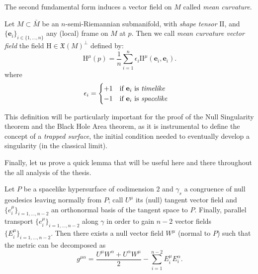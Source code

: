 The second fundamental form induces a vector field on \(M\) called \emph{mean curvature}.


\begin{definition}
		Let \(M \subset \bar{M}\) be an \(n\)-semi-Riemannian submanifold, with \emph{shape tensor} \(\mathrm{I\!I}\), and \(\{\textbf{e}_i\}_{i \in \{1, \ldots, n\}}\) any (local) frame on \(M\) at \(p\). Then we call \emph{mean curvature vector field} the field \(\mathrm{H} \in \mathfrak{X}(M)^{\perp} \) defined by:
		\[
		\mathrm{H}^{\mu}(p) = \frac{1}{n} \sum_{i=1}^{n} \epsilon_i \mathrm{I\!I}^{\mu}(\textbf{e}_i, \textbf{e}_i).
		\]
		where 
		\[
		\epsilon_i = 
		\begin{cases}
		+1 \quad \text{if } \textbf{e}_i \text{ is \emph{timelike}} \\
		-1 \quad \text{if } \textbf{e}_i \text{ is \emph{spacelike}}
		\end{cases}
		\]
\end{definition}

This definition will be particularly important for the proof of the Null Singularity theorem and the Black Hole Area theorem, as it is instrumental to define the concept of a \emph{trapped surface}, the initial condition needed to eventually develop a singularity (in the classical limit). 

Finally, let us prove a quick lemma that will be useful here and there throughout the all analysis of the thesis.
\begin{lemma}
	\label{lemma:metric-decomposition}
	Let \(P\) be a spacelike hypersurface of codimension \(2\) and \(\gamma_s\) a congruence of null geodesics leaving normally from \(P\); call \(U^{\mu}\) its (null) tangent vector field and \(\{e_i^{\mu}\}_{i = 1, \ldots, n - 2}\) an orthonormal basis of the tangent space to \(P\). Finally, parallel transport \(\{e_i^{\mu}\}_{i = 1, \ldots, n - 2}\) along \(\gamma\) in order to gain \(n - 2\) vector fields \(\{E_i^{\mu}\}_{i = 1, \ldots, n - 2}\). Then there exists a null vector field \(W^{\mu}\) (normal to \(P\)) such that the metric can be decomposed as
	\begin{equation}
		g^{\mu\alpha} = \frac{U^{\mu}W^{\alpha} + U^{\alpha}W^{\mu}}{2} - \sum_{i=1}^{n - 2}E_i^{\mu}E_i^{\alpha}.
	\end{equation}
\end{lemma}


